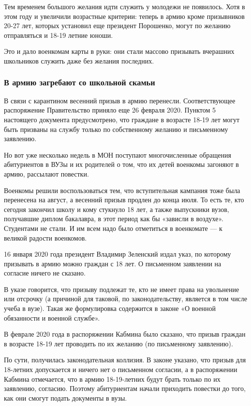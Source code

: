 \documentclass[a4paper,11pt]{extreport}
\begin{document}
Тем временем большого желания идти служить у молодежи не появилось. Хотя в этом
году и увеличили возрастные критерии: теперь в армию кроме призывников 20-27
лет, которых установил еще президент Порошенко, могут по желанию отправляться и
18-19 летние юноши. 

Это и дало военкомам карты в руки: они стали массово призывать вчерашних
школьников служить даже без желания последних. 

\subsubsection{В армию загребают со школьной скамьи }

В связи с карантином весенний призыв в армию перенесли. Соответствующее
распоряжение Правительство приняло еще 26 февраля 2020. Пунктом 5 настоящего
документа предусмотрено, что граждане в возрасте 18-19 лет могут быть призваны
на службу только по собственному желанию и письменному заявлению. 

Но вот уже несколько недель в МОН поступают многочисленные обращения
абитуриентов в ВУЗы и их родителей о том, что их детей военкомы загоняют в
армию, рассылают повестки. 

Военкомы решили воспользоваться тем, что вступительная кампания тоже была
перенесена на август, а весенний призыв продлен до конца июля. То есть те, кто
сегодня закончил школу и кому стукнуло 18 лет, а также выпускники вузов,
получавшие диплом бакалавра, в этот период как бы «зависли в воздухе».
Студентами не стали. И им всем надо было отметиться в военкомате --- к великой
радости военкомов. 

16 января 2020 года президент Владимир Зеленский издал указ, по которому
призывать в армию можно граждан с 18 лет. О письменном заявлении на согласие
ничего не сказано. 

В указе говорится, что призыву подлежат те, кто не имеет права на увольнение
или отсрочку (а причиной для таковой, по законодательству, является в том числе
учеба в вузе). Такая же формулировка содержится в законе «О военной обязанности
и военной службе». 

В феврале 2020 года в распоряжении Кабмина было сказано, что призыв граждан в
возрасте 18-19 лет проводить по их желанию (по письменному заявлению). 

По сути, получилась законодательная коллизия. В законе указано, что призыв для
18-летних допускается и ничего нет о письменном согласии, а в распоряжении
Кабмина отмечается, что в армию 18-19-летних будут брать только по их
заявлению, согласию. Поэтому абитуриентам начали приходить повестки до того,
как они смогут подать документы в вузы. 
\end{document}

